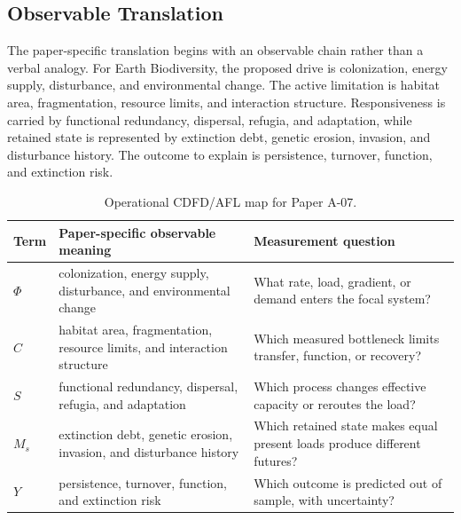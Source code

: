 \documentclass[11pt,a4paper]{article}
\begin{document}
\subsection{Observable Translation}

The paper-specific translation begins with an observable chain rather than a
verbal analogy. For Earth Biodiversity, the proposed drive is colonization, energy supply, disturbance, and environmental change.
The active limitation is habitat area, fragmentation, resource limits, and interaction structure. Responsiveness is carried by
functional redundancy, dispersal, refugia, and adaptation, while retained state is represented by
extinction debt, genetic erosion, invasion, and disturbance history. The outcome to explain is persistence, turnover, function, and extinction risk.

\begin{table}[htbp]
\centering
\small
\caption{Operational CDFD/AFL map for Paper A-07.}
\begin{tabularx}{\textwidth}{|l|X|X|}
\hline
\textbf{Term} & \textbf{Paper-specific observable meaning} & \textbf{Measurement question} \\
\hline
$\Phi$ & colonization, energy supply, disturbance, and environmental change & What rate, load, gradient, or demand enters the focal system? \\
\hline
$C$ & habitat area, fragmentation, resource limits, and interaction structure & Which measured bottleneck limits transfer, function, or recovery? \\
\hline
$S$ & functional redundancy, dispersal, refugia, and adaptation & Which process changes effective capacity or reroutes the load? \\
\hline
$M_s$ & extinction debt, genetic erosion, invasion, and disturbance history & Which retained state makes equal present loads produce different futures? \\
\hline
$Y$ & persistence, turnover, function, and extinction risk & Which outcome is predicted out of sample, with uncertainty? \\
\hline
\end{tabularx}
\end{table}
\end{document}
